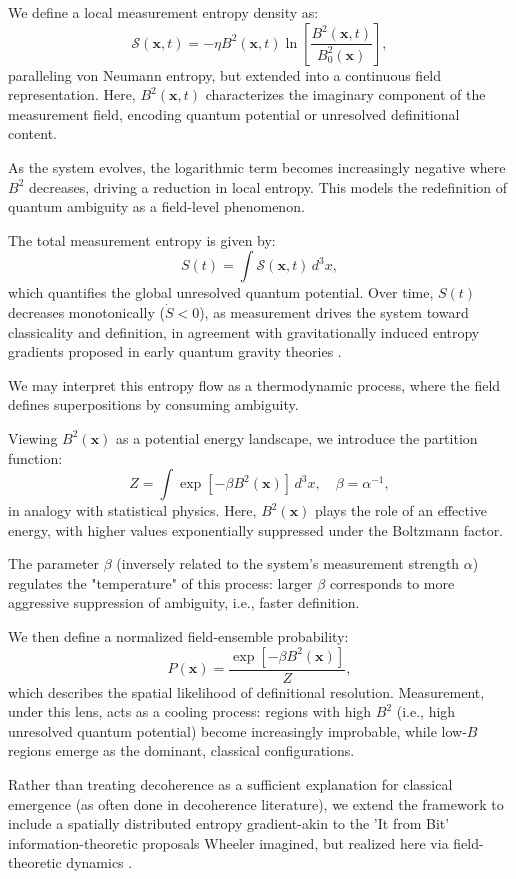 We define a local measurement entropy density as:
\[
\mathcal{S}(\mathbf{x},t) = -\eta B^2(\mathbf{x},t)\ln\left[\frac{B^2(\mathbf{x},t)}{B_0^2(\mathbf{x})}\right],
\]
paralleling von Neumann entropy, but extended into a continuous field representation. Here, \(B^2(\mathbf{x},t)\) characterizes the imaginary component of the measurement field, encoding quantum potential or unresolved definitional content.

As the system evolves, the logarithmic term becomes increasingly negative where \(B^2\) decreases, driving a reduction in local entropy. This models the redefinition of quantum ambiguity as a field-level phenomenon.

The total measurement entropy is given by:
\[
S(t) = \int \mathcal{S}(\mathbf{x},t)\,d^3x,
\]
which quantifies the global unresolved quantum potential. Over time, \(S(t)\) decreases monotonically (\(\dot{S} < 0\)), as measurement drives the system toward classicality and definition, in agreement with gravitationally induced entropy gradients proposed in early quantum gravity theories \cite{penrose_gravitys_1996}.



We may interpret this entropy flow as a thermodynamic process, where the field defines superpositions by consuming ambiguity.

Viewing \(B^2(\mathbf{x})\) as a potential energy landscape, we introduce the partition function:
\[
Z = \int \exp[-\beta B^2(\mathbf{x})]\,d^3x, \quad \beta = \alpha^{-1},
\]
in analogy with statistical physics. Here, \(B^2(\mathbf{x})\) plays the role of an effective energy, with higher values exponentially suppressed under the Boltzmann factor.

The parameter \(\beta\) (inversely related to the system's measurement strength \(\alpha\)) regulates the "temperature" of this process: larger \(\beta\) corresponds to more aggressive suppression of ambiguity, i.e., faster definition.

We then define a normalized field-ensemble probability:
\[
P(\mathbf{x}) = \frac{\exp[-\beta B^2(\mathbf{x})]}{Z},
\]
which describes the spatial likelihood of definitional resolution. Measurement, under this lens, acts as a cooling process: regions with high \(B^2\) (i.e., high unresolved quantum potential) become increasingly improbable, while low-\(B\) regions emerge as the dominant, classical configurations.

Rather than treating decoherence as a sufficient explanation for classical emergence (as often done in decoherence literature), we extend the framework to include a spatially distributed entropy gradient-akin to the 'It from Bit' information-theoretic proposals Wheeler imagined, but realized here via field-theoretic dynamics \cite{wheeler_it_1990}.

